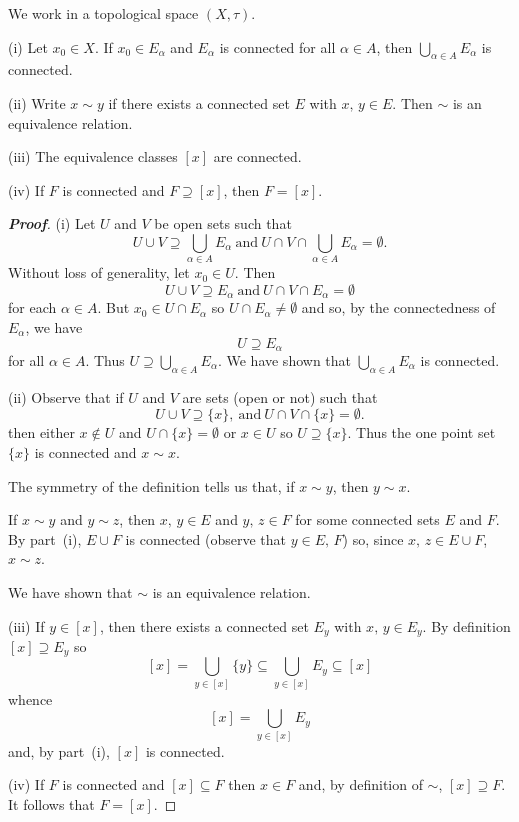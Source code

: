 \begin{lemma}\label{L;connected components}
We work in a topological space $(X,\tau)$.

(i) Let $x_{0}\in X$. If $x_{0}\in E_{\alpha}$ 
and $E_{\alpha}$ is connected for all $\alpha\in A$,
then $\bigcup_{\alpha\in A}E_{\alpha}$ is connected.

(ii) Write $x\sim y$ if there exists a connected set $E$
with $x,\,y\in E$. Then $\sim$ is an equivalence relation.

(iii) The equivalence classes $[x]$ are connected.

(iv) If $F$ is connected and $F\supseteq [x]$, then $F=[x]$.
\end{lemma}
\begin{proof}[\bf Proof] (i) Let $U$ and $V$ be open sets such that
\[U\cup V\supseteq \bigcup_{\alpha\in A}E_{\alpha}
\ \text{and}
\ U\cap V\cap \bigcup_{\alpha\in A}E_{\alpha}=\emptyset.\]
Without loss of generality, let $x_{0}\in U$.
Then
\[U\cup V\supseteq E_{\alpha}
\ \text{and}
\ U\cap V\cap E_{\alpha}=\emptyset\]
for each $\alpha\in A$. But
$x_{0}\in U\cap E_{\alpha}$ so
$U\cap E_{\alpha}\neq\emptyset$ and so, by the
connectedness of $E_{\alpha}$, we have
\[U\supseteq E_{\alpha}\]
for all $\alpha\in A$. Thus 
$U\supseteq \bigcup_{\alpha\in A}E_{\alpha}$.
We have shown that $\bigcup_{\alpha\in A}E_{\alpha}$ is connected.

(ii) Observe that if $U$ and $V$ are sets (open or not) such that
\[U\cup V\supseteq \{x\},
\ \text{and}
\ U\cap V\cap \{x\}=\emptyset.\]
then either $x\notin U$ and $U\cap\{x\}=\emptyset$
or $x\in U$ so $U\supseteq\{x\}$. Thus the one point set 
$\{x\}$ is connected and $x\sim x$.

The symmetry of the definition tells us that,
if $x\sim y$, then $y\sim x$.

If $x\sim y$ and $y\sim z$, then $x,\,y\in E$ and $y,\,z\in F$
for some connected sets $E$ and $F$. By part~(i),
$E\cup F$ is connected (observe that $y\in E,\,F$)
so, since $x,\,z\in E\cup F$, $x\sim z$. 

We have shown that $\sim$ is an equivalence relation.

(iii) If $y\in [x]$, then there exists a connected set $E_{y}$
with $x,\,y\in E_{y}$. By definition $[x]\supseteq E_{y}$ so
\[[x]=\bigcup_{y\in[x]}\{y\}\subseteq \bigcup_{y\in[x]}E_{y}\subseteq [x]\]
whence
\[[x]=\bigcup_{y\in[x]}E_{y}\]
and, by part~(i), $[x]$ is connected.

(iv) If $F$ is connected and $[x]\subseteq F$ then $x\in F$
and, by definition of $\sim$, $[x]\supseteq F$.
It follows that $F=[x]$.
\end{proof}


